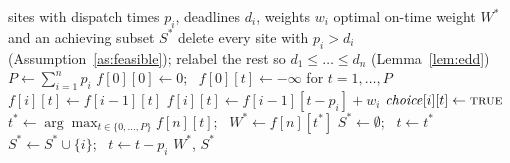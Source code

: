 \documentclass[pdflatex,sn-mathphys-ay]{sn-jnl}
\theoremstyle{thmstyleone}
\theoremstyle{thmstyletwo}
\theoremstyle{thmstylethree}
\providecommand{\DIFaddbegin}{} %
\providecommand{\DIFaddend}{} %
\providecommand{\DIFdelbegin}{} %
\providecommand{\DIFdelend}{} %
\newcommand{\DIFscaledelfig}{0.5}
\newlength{\DIFdelgraphicswidth} %
\newlength{\DIFdelgraphicsheight} %
\newcommand{\DIFaddincludegraphics}[2][]{{\color{blue}\fbox{\DIFOincludegraphics[#1]{#2}}}} %
\newcommand{\DIFdelincludegraphics}[2][]{%
\sbox{\DIFdelgraphicsbox}{\DIFOincludegraphics[#1]{#2}}%
\settoboxwidth{\DIFdelgraphicswidth}{\DIFdelgraphicsbox} %
\settoboxtotalheight{\DIFdelgraphicsheight}{\DIFdelgraphicsbox} %
\scalebox{\DIFscaledelfig}{%
\parbox[b]{\DIFdelgraphicswidth}{\usebox{\DIFdelgraphicsbox}\\[-\baselineskip] \rule{\DIFdelgraphicswidth}{0em}}\llap{\resizebox{\DIFdelgraphicswidth}{\DIFdelgraphicsheight}{%
\setlength{\unitlength}{\DIFdelgraphicswidth}%
\begin{picture}(1,1)%
\thicklines\linethickness{2pt} %
{\color[rgb]{1,0,0}\put(0,0){\framebox(1,1){}}}%
{\color[rgb]{1,0,0}\put(0,0){\line( 1,1){1}}}%
{\color[rgb]{1,0,0}\put(0,1){\line(1,-1){1}}}%
\end{picture}%
}\hspace*{3pt}}} %
} %
\DeclareRobustCommand{\DIFaddbegin}{\DIFOaddbegin \let\includegraphics\DIFaddincludegraphics} %
\DeclareRobustCommand{\DIFaddend}{\DIFOaddend \let\includegraphics\DIFOincludegraphics} %
\DeclareRobustCommand{\DIFdelbegin}{\DIFOdelbegin \let\includegraphics\DIFdelincludegraphics} %
\DeclareRobustCommand{\DIFdelend}{\DIFOaddend \let\includegraphics\DIFOincludegraphics} %
\begin{document}
\begin{algorithm}
\caption{Exact dynamic program for MWHED (Theorem~\ref{thm:dp})}\label{alg:exact}
\DIFdelbegin %
\DIFdelend \DIFaddbegin \begin{algorithmic}[1]
\Require sites with dispatch times $p_i$, deadlines $d_i$, weights $w_i$
\Ensure optimal on-time weight $W^\ast$ and an achieving subset $S^\ast$
\State delete every site with $p_i > d_i$ (Assumption~\ref{as:feasible}); relabel the rest so $d_1 \le \dots \le d_n$ (Lemma~\ref{lem:edd})
\State $P \gets \sum_{i=1}^n p_i$
\State $f[0][0] \gets 0$; \ $f[0][t] \gets -\infty$ for $t=1,\dots,P$
    \State $f[i][t] \gets f[i-1][t]$ 
        \State $f[i][t] \gets f[i-1][t-p_i] + w_i$
        \State $\mathit{choice}[i][t] \gets \textsc{true}$ 
      \EndIf
    \EndIf
  \EndFor
\EndFor
\State $t^\ast \gets \arg\max_{t \in \{0,\dots,P\}} f[n][t]$; \ $W^\ast \gets f[n][t^\ast]$
\State $S^\ast \gets \emptyset$; \ $t \gets t^\ast$
 
    \State $S^\ast \gets S^\ast \cup \{i\}$; \ $t \gets t - p_i$
  \EndIf
\EndFor
\State \Return $W^\ast$, $S^\ast$
\end{algorithmic}
\DIFaddend \end{algorithm}
\end{document}
